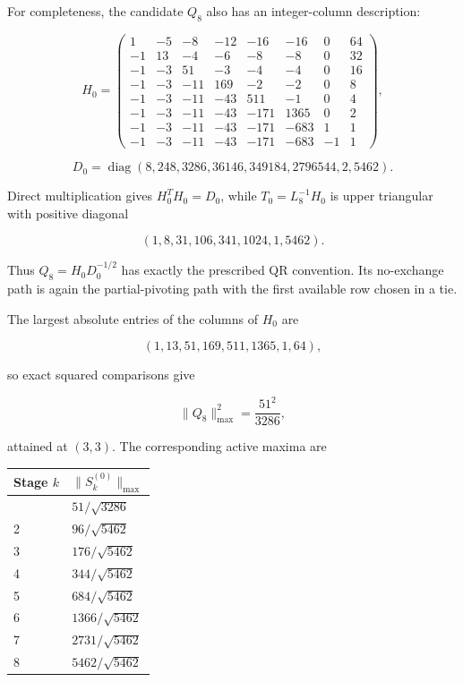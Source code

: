\documentclass[10pt,a4paper]{article}
\newcounter{none} %
\begin{document}
For completeness, the candidate \(Q_8\) also has an integer-column
description:

\nopagebreak[4]

\[
H_0=
\begin{pmatrix}
1&-5&-8&-12&-16&-16&0&64\\
-1&13&-4&-6&-8&-8&0&32\\
-1&-3&51&-3&-4&-4&0&16\\
-1&-3&-11&169&-2&-2&0&8\\
-1&-3&-11&-43&511&-1&0&4\\
-1&-3&-11&-43&-171&1365&0&2\\
-1&-3&-11&-43&-171&-683&1&1\\
-1&-3&-11&-43&-171&-683&-1&1
\end{pmatrix},
\]

\nopagebreak[4]

\[
D_0=\operatorname{diag}(8,248,3286,36146,349184,2796544,2,5462).
\]

Direct multiplication gives \(H_0^TH_0=D_0\), while \(T_0=L_8^{-1}H_0\)
is upper triangular with positive diagonal

\nopagebreak[4]

\[
(1,8,31,106,341,1024,1,5462).
\]

Thus \(Q_8=H_0D_0^{-1/2}\) has exactly the prescribed QR convention. Its
no-exchange path is again the partial-pivoting path with the first
available row chosen in a tie.

The largest absolute entries of the columns of \(H_0\) are

\nopagebreak[4]

\[
(1,13,51,169,511,1365,1,64),
\]

so exact squared comparisons give

\nopagebreak[4]

\[
\|Q_8\|_{\max}^2=\frac{51^2}{3286},
\]

attained at \((3,3)\). The corresponding active maxima are

{\def\LTcaptype{none} %
\begin{longtable}[]{@{}ll@{}}
\toprule\noalign{}
Stage \(k\) & \(\|S_k^{(0)}\|_{\max}\) \\
\midrule\noalign{}
\endhead
\bottomrule\noalign{}
\endlastfoot
1 & \(51/\sqrt{3286}\) \\
2 & \(96/\sqrt{5462}\) \\
3 & \(176/\sqrt{5462}\) \\
4 & \(344/\sqrt{5462}\) \\
5 & \(684/\sqrt{5462}\) \\
6 & \(1366/\sqrt{5462}\) \\
7 & \(2731/\sqrt{5462}\) \\
8 & \(5462/\sqrt{5462}\) \\
\end{longtable}
}
\end{document}
